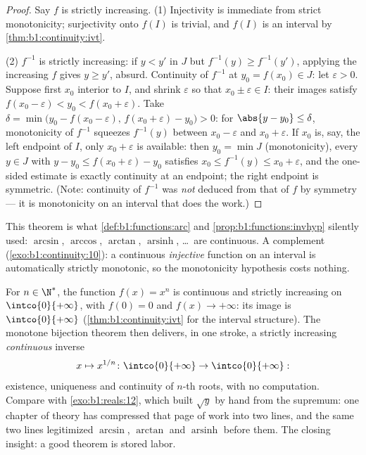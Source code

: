 \begin{proof}
Say $f$ is strictly increasing. (1) Injectivity is immediate from
strict monotonicity; surjectivity onto $f(I)$ is trivial, and $f(I)$
is an interval by \cref{thm:b1:continuity:ivt}.

(2) $f^{-1}$ is strictly increasing: if $y < y'$ in $J$ but $f^{-1}(y)
\geq f^{-1}(y')$, applying the increasing $f$ gives $y \geq y'$,
absurd. Continuity of $f^{-1}$ at $y_0 = f(x_0) \in J$: let
$\varepsilon > 0$. Suppose first $x_0$ interior to $I$, and
shrink $\varepsilon$ so that $x_0 \pm \varepsilon \in I$: their
images satisfy $f(x_0 - \varepsilon) < y_0 < f(x_0 +
\varepsilon)$. Take
$\delta = \min\bigl(y_0 - f(x_0 - \varepsilon),\, f(x_0 +
\varepsilon) - y_0\bigr) > 0$: for $\abs{y - y_0} \leq \delta$,
monotonicity of $f^{-1}$ squeezes $f^{-1}(y)$ between $x_0 -
\varepsilon$ and $x_0 + \varepsilon$. If $x_0$ is, say, the left
endpoint of $I$, only $x_0 + \varepsilon$ is available: then
$y_0 = \min J$ (monotonicity), every $y \in J$ with $y - y_0
\leq f(x_0 + \varepsilon) - y_0$ satisfies $x_0 \leq f^{-1}(y)
\leq x_0 + \varepsilon$, and the one-sided estimate is exactly
continuity at an endpoint; the right endpoint is symmetric.
(Note: continuity of $f^{-1}$
was \emph{not} deduced from that of $f$ by symmetry --- it is
monotonicity on an interval that does the work.)
\end{proof}

\begin{remark}
This theorem is what \cref{def:b1:functions:arc} and
\cref{prop:b1:functions:invhyp} silently used: $\arcsin$, $\arccos$,
$\arctan$, $\operatorname{arsinh}$, \dots\ are continuous. A
complement (\cref{exo:b1:continuity:10}): a continuous
\emph{injective} function on an interval is automatically strictly
monotonic, so the monotonicity hypothesis costs nothing.
\end{remark}

\begin{example}\label{ex:b1:continuity:nthroot}
For $n \in \N^*$, the function $f(x) = x^n$ is continuous and
strictly increasing on $\intco{0}{+\infty}$, with $f(0) = 0$ and
$f(x) \to +\infty$: its image is $\intco{0}{+\infty}$
(\cref{thm:b1:continuity:ivt} for the interval structure). The
monotone bijection theorem then delivers, in one stroke, a
strictly increasing \emph{continuous} inverse
\[
x \mapsto x^{1/n} \colon \intco{0}{+\infty} \to
\intco{0}{+\infty} :
\]
existence, uniqueness and continuity of $n$-th roots, with no
computation. Compare with \cref{exo:b1:reals:12}, which built
$\sqrt y$ by hand from the supremum: one chapter of theory has
compressed that page of work into two lines, and the same two
lines legitimized $\arcsin$, $\arctan$ and
$\operatorname{arsinh}$ before them. The closing insight: a good
theorem is stored labor.
\end{example}

